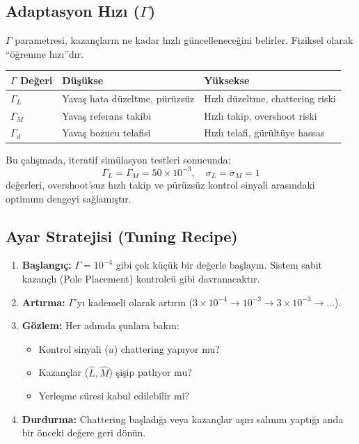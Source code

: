\documentclass[12pt,a4paper]{article}
\begin{document}
\subsection{Adaptasyon Hızı ($\Gamma$)}

$\Gamma$ parametresi, kazançların ne kadar hızlı güncelleneceğini belirler. Fiziksel olarak ``öğrenme hızı''dır.

\begin{center}
\begin{tabular}{lp{5cm}p{5cm}}
\toprule
\textbf{$\Gamma$ Değeri} & \textbf{Düşükse} & \textbf{Yüksekse} \\
\midrule
$\Gamma_L$ & Yavaş hata düzeltme, pürüzsüz & Hızlı düzeltme, chattering riski \\
$\Gamma_M$ & Yavaş referans takibi & Hızlı takip, overshoot riski \\
$\Gamma_d$ & Yavaş bozucu telafisi & Hızlı telafi, gürültüye hassas \\
\bottomrule
\end{tabular}
\end{center}

Bu çalışmada, iteratif simülasyon testleri sonucunda:
\begin{equation}
    \Gamma_L = \Gamma_M = 50 \times 10^{-3}, \quad \sigma_L = \sigma_M = 1
\end{equation}
değerleri, overshoot'suz hızlı takip ve pürüzsüz kontrol sinyali arasındaki optimum dengeyi sağlamıştır.

\subsection{Ayar Stratejisi (Tuning Recipe)}

\begin{enumerate}
    \item \textbf{Başlangıç:} $\Gamma = 10^{-4}$ gibi çok küçük bir değerle başlayın. Sistem sabit kazançlı (Pole Placement) kontrolcü gibi davranacaktır.
    \item \textbf{Artırma:} $\Gamma$'yı kademeli olarak artırın ($3 \times 10^{-4} \to 10^{-3} \to 3 \times 10^{-3} \to \ldots$).
    \item \textbf{Gözlem:} Her adımda şunlara bakın:
    \begin{itemize}
        \item Kontrol sinyali ($u$) chattering yapıyor mu?
        \item Kazançlar ($\hat{L}, \hat{M}$) şişip patlıyor mu?
        \item Yerleşme süresi kabul edilebilir mi?
    \end{itemize}
    \item \textbf{Durdurma:} Chattering başladığı veya kazançlar aşırı salınım yaptığı anda bir önceki değere geri dönün.
\end{enumerate}
\end{document}
